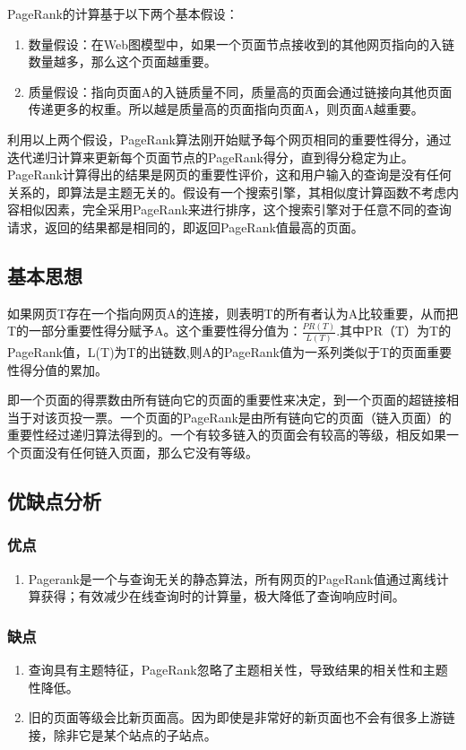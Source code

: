 \documentclass{article}
\begin{document}
PageRank的计算基于以下两个基本假设：
\begin{enumerate}
    \item 数量假设：在Web图模型中，如果一个页面节点接收到的其他网页指向的入链数量越多，那么这个页面越重要。
    \item 质量假设：指向页面A的入链质量不同，质量高的页面会通过链接向其他页面传递更多的权重。所以越是质量高的页面指向页面A，则页面A越重要。
    
\end{enumerate}

利用以上两个假设，PageRank算法刚开始赋予每个网页相同的重要性得分，通过迭代递归计算来更新每个页面节点的PageRank得分，直到得分稳定为止。 PageRank计算得出的结果是网页的重要性评价，这和用户输入的查询是没有任何关系的，即算法是主题无关的。假设有一个搜索引擎，其相似度计算函数不考虑内容相似因素，完全采用PageRank来进行排序，这个搜索引擎对于任意不同的查询请求，返回的结果都是相同的，即返回PageRank值最高的页面。

\subsection{基本思想}
如果网页T存在一个指向网页A的连接，则表明T的所有者认为A比较重要，从而把T的一部分重要性得分赋予A。这个重要性得分值为：$\frac{PR(T)}{L(T)}$.其中PR（T）为T的PageRank值，L(T)为T的出链数,则A的PageRank值为一系列类似于T的页面重要性得分值的累加。

即一个页面的得票数由所有链向它的页面的重要性来决定，到一个页面的超链接相当于对该页投一票。一个页面的PageRank是由所有链向它的页面（链入页面）的重要性经过递归算法得到的。一个有较多链入的页面会有较高的等级，相反如果一个页面没有任何链入页面，那么它没有等级。


\subsection{优缺点分析}
\subsubsection{优点}
\begin{enumerate}
    \item Pagerank是一个与查询无关的静态算法，所有网页的PageRank值通过离线计算获得；有效减少在线查询时的计算量，极大降低了查询响应时间。
\end{enumerate}

\subsubsection{缺点}
\begin{enumerate}
    \item 查询具有主题特征，PageRank忽略了主题相关性，导致结果的相关性和主题性降低。
    \item 旧的页面等级会比新页面高。因为即使是非常好的新页面也不会有很多上游链接，除非它是某个站点的子站点。
\end{enumerate}
\end{document}
